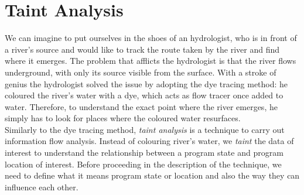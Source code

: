 \documentclass[LaM,binding=0.6cm]{sapthesis}
\begin{document}
\section{Taint Analysis}
\label{sec:taintanalysis}
We can imagine to put ourselves in the shoes of an hydrologist, who is in front of a river's source and would like to track the route taken by the river and find where it emerges. The problem that afflicts the hydrologist is that the river flows underground, with only its source visible from the surface. With a stroke of genius the hydrologist solved the issue by adopting the dye tracing method: he coloured the river's water with a dye, which acts as flow tracer once added to water. Therefore, to understand the exact point where the river emerges, he simply has to look for places where the coloured water resurfaces.\\

Similarly to the dye tracing method, \textit{taint analysis} is a technique to carry out information flow analysis. Instead of colouring river's water, we \textit{taint} the data of interest to understand the relationship between a program state and program location of interest\cite{Practicalbinaryanalysis}. Before proceeding in the description of the technique, we need to define what it means program state or location and also the way they can influence each other.\\
\end{document}
